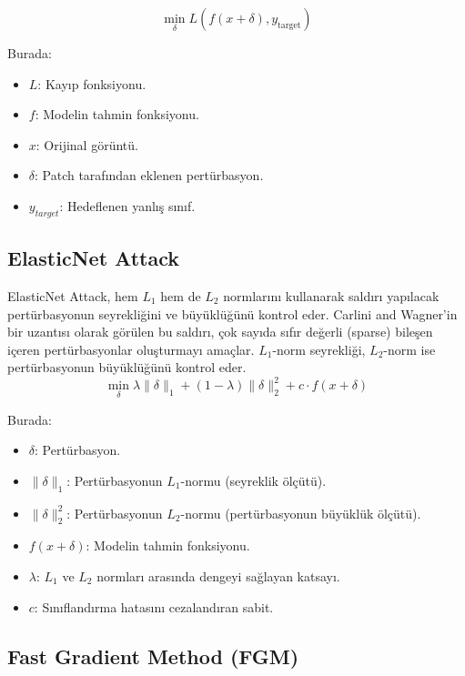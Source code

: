 \[ \min_\delta L(f(x + \delta), y_{\text{target}}) \]

Burada:

\begin{itemize}
    \item $L$: Kayıp fonksiyonu.
    \item $f$: Modelin tahmin fonksiyonu.
    \item $x$: Orijinal görüntü.
    \item $\delta$: Patch tarafından eklenen pertürbasyon.
    \item $y_{target}$: Hedeflenen yanlış sınıf.
\end{itemize}

\newpage

\subsection{ElasticNet Attack}

ElasticNet Attack, hem $L_1$ hem de $L_2$ normlarını kullanarak saldırı yapılacak pertürbasyonun seyrekliğini ve büyüklüğünü kontrol eder. Carlini and Wagner'in bir uzantısı olarak görülen bu saldırı, çok sayıda sıfır değerli (sparse) bileşen içeren pertürbasyonlar oluşturmayı amaçlar. $L_1$-norm seyrekliği, $L_2$-norm ise pertürbasyonun büyüklüğünü kontrol eder.
\[ \min_\delta \lambda \|\delta\|_1 + (1 - \lambda) \|\delta\|_2^2 + c \cdot f(x + \delta) \]

Burada:

\begin{itemize}
    \item $\delta$: Pertürbasyon.
    \item $\|\delta\|_1$: Pertürbasyonun $L_1$-normu (seyreklik ölçütü).
    \item $\|\delta\|_2^2$: Pertürbasyonun $L_2$-normu (pertürbasyonun büyüklük ölçütü).
    \item $f(x + \delta)$: Modelin tahmin fonksiyonu.
    \item $\lambda$: $L_1$ ve $L_2$ normları arasında dengeyi sağlayan katsayı.
    \item $c$: Sınıflandırma hatasını cezalandıran sabit.
\end{itemize}

\newpage

\subsection{Fast Gradient Method (FGM)}

